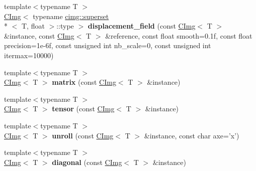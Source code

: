 \begin{DoxyCompactItemize}
\item 
\hypertarget{namespacecimg__library_aaffc6e0c063cefb1fdc815b2b07189cd}{{\footnotesize template$<$typename T $>$ }\\\hyperlink{structcimg__library_1_1_c_img}{C\-Img}$<$ typename \hyperlink{structcimg__library_1_1cimg_1_1superset}{cimg\-::superset}\\*
$<$ T, float $>$\-::type $>$ {\bfseries displacement\-\_\-field} (const \hyperlink{structcimg__library_1_1_c_img}{C\-Img}$<$ T $>$ \&instance, const \hyperlink{structcimg__library_1_1_c_img}{C\-Img}$<$ T $>$ \&reference, const float smooth=0.\-1f, const float precision=1e-\/6f, const unsigned int nb\-\_\-scale=0, const unsigned int itermax=10000)}\label{namespacecimg__library_aaffc6e0c063cefb1fdc815b2b07189cd}

\item 
\hypertarget{namespacecimg__library_a62a81ca20955cac96f7a34f656609cd3}{{\footnotesize template$<$typename T $>$ }\\\hyperlink{structcimg__library_1_1_c_img}{C\-Img}$<$ T $>$ {\bfseries matrix} (const \hyperlink{structcimg__library_1_1_c_img}{C\-Img}$<$ T $>$ \&instance)}\label{namespacecimg__library_a62a81ca20955cac96f7a34f656609cd3}

\item 
\hypertarget{namespacecimg__library_aeab76a77652f047b69e9dba537a54fef}{{\footnotesize template$<$typename T $>$ }\\\hyperlink{structcimg__library_1_1_c_img}{C\-Img}$<$ T $>$ {\bfseries tensor} (const \hyperlink{structcimg__library_1_1_c_img}{C\-Img}$<$ T $>$ \&instance)}\label{namespacecimg__library_aeab76a77652f047b69e9dba537a54fef}

\item 
\hypertarget{namespacecimg__library_ae7b580c9331ba405f37cabd394ba0de5}{{\footnotesize template$<$typename T $>$ }\\\hyperlink{structcimg__library_1_1_c_img}{C\-Img}$<$ T $>$ {\bfseries unroll} (const \hyperlink{structcimg__library_1_1_c_img}{C\-Img}$<$ T $>$ \&instance, const char axe='x')}\label{namespacecimg__library_ae7b580c9331ba405f37cabd394ba0de5}

\item 
\hypertarget{namespacecimg__library_a9bb0df769ff84eb0fbb115ef8fbff9e1}{{\footnotesize template$<$typename T $>$ }\\\hyperlink{structcimg__library_1_1_c_img}{C\-Img}$<$ T $>$ {\bfseries diagonal} (const \hyperlink{structcimg__library_1_1_c_img}{C\-Img}$<$ T $>$ \&instance)}\label{namespacecimg__library_a9bb0df769ff84eb0fbb115ef8fbff9e1}


\end{DoxyCompactItemize}
